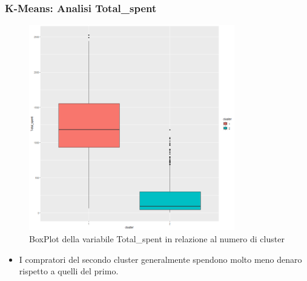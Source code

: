 \begin{frame}[fragile]
\frametitle{K-Means: Analisi Total\_spent}
\begin{minipage}{0.45\textwidth}
\begin{figure}[H]
        \centering
    \includegraphics[width=0.8\textwidth]{Img/KMEANS015.png}
    \caption{BoxPlot della variabile Total\_spent in relazione al numero di cluster}
    \label{fig:TotalSpentKmeansBoxPlot}
\end{figure}
\end{minipage}%
\hspace{2em}
\begin{minipage}{0.45\textwidth}
\begin{itemize}
    \item I compratori del secondo cluster generalmente spendono molto meno denaro rispetto a quelli del primo.
\end{itemize}
\end{minipage}%
\end{frame}
